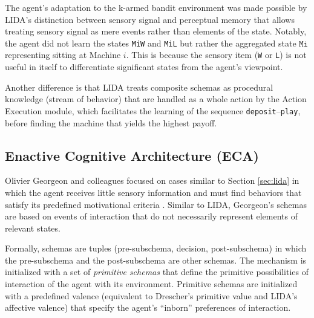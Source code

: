 \documentclass[runningheads]{llncs}
\begin{document}
The agent's adaptation to the k-armed bandit environment was made possible by LIDA's distinction between sensory signal and perceptual memory that allows treating sensory signal as mere events rather than elements of the state. 
Notably, the agent did not learn the states \texttt{MiW} and \texttt{MiL} but rather the aggregated state $\texttt{Mi}$ representing sitting at Machine $i$.
This is because the sensory item (\texttt{W} or \texttt{L}) is not useful in itself to differentiate significant states from the agent's viewpoint. 

Another difference is that LIDA treats composite schemas as procedural knowledge (stream of behavior) that are handled as a whole action by the Action Execution module, which facilitates the learning of the sequence \texttt{deposit}--\texttt{play}, before finding the machine that yields the highest payoff. 


\subsection{Enactive Cognitive Architecture (ECA)}

Olivier Georgeon and colleagues focused on cases similar to Section \ref{sec:lida} in which the agent receives little sensory information and must find behaviors that satisfy its predefined motivational criteria \cite{georgeon_intrinsically-motivated_2012} . 
Similar to LIDA, Georgeon's schemas are based on events of interaction that do not necessarily represent elements of relevant states.  

Formally, schemas are tuples (pre-subschema, decision, post-subschema) in which the pre-subschema and the post-subschema are other schemas.  
The mechanism is initialized with a set of \textit{primitive schemas} that define the primitive possibilities of interaction of the agent with its environment. 
Primitive schemas are initialized with a predefined valence (equivalent to Drescher's primitive value and LIDA's affective valence) that specify the agent's ``inborn'' preferences of interaction. 
\end{document}
